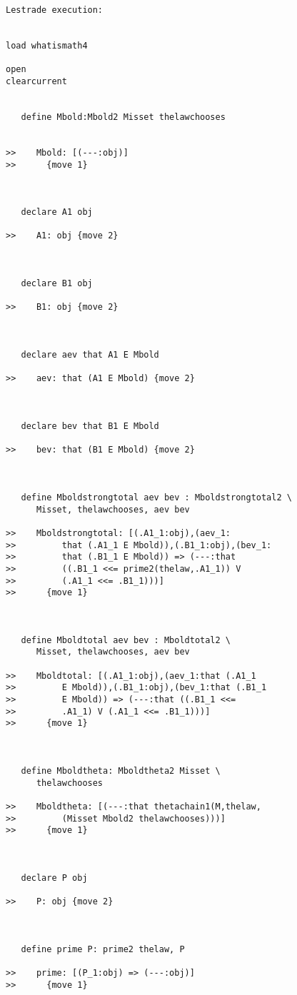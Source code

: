 \documentclass[12pt]{article}
\begin{document}
\begin{verbatim}Lestrade execution:


load whatismath4

open
clearcurrent


   define Mbold:Mbold2 Misset thelawchooses


>>    Mbold: [(---:obj)]
>>      {move 1}



   declare A1 obj

>>    A1: obj {move 2}



   declare B1 obj

>>    B1: obj {move 2}



   declare aev that A1 E Mbold

>>    aev: that (A1 E Mbold) {move 2}



   declare bev that B1 E Mbold

>>    bev: that (B1 E Mbold) {move 2}



   define Mboldstrongtotal aev bev : Mboldstrongtotal2 \
      Misset, thelawchooses, aev bev

>>    Mboldstrongtotal: [(.A1_1:obj),(aev_1:
>>         that (.A1_1 E Mbold)),(.B1_1:obj),(bev_1:
>>         that (.B1_1 E Mbold)) => (---:that
>>         ((.B1_1 <<= prime2(thelaw,.A1_1)) V
>>         (.A1_1 <<= .B1_1)))]
>>      {move 1}



   define Mboldtotal aev bev : Mboldtotal2 \
      Misset, thelawchooses, aev bev

>>    Mboldtotal: [(.A1_1:obj),(aev_1:that (.A1_1
>>         E Mbold)),(.B1_1:obj),(bev_1:that (.B1_1
>>         E Mbold)) => (---:that ((.B1_1 <<=
>>         .A1_1) V (.A1_1 <<= .B1_1)))]
>>      {move 1}



   define Mboldtheta: Mboldtheta2 Misset \
      thelawchooses

>>    Mboldtheta: [(---:that thetachain1(M,thelaw,
>>         (Misset Mbold2 thelawchooses)))]
>>      {move 1}



   declare P obj

>>    P: obj {move 2}



   define prime P: prime2 thelaw, P

>>    prime: [(P_1:obj) => (---:obj)]
>>      {move 1}




\end{verbatim}
\end{document}
